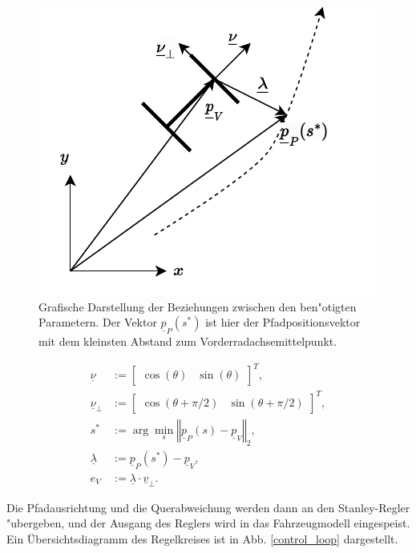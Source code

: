 \documentclass[arbeit=studie,oneside,BCOR=12mm]{ArbeitRST}
\begin{document}
\begin{figure}[h]
    \centering
    \includegraphics{dot_product}
    \caption{Grafische Darstellung der Beziehungen zwischen den ben"otigten
    Parametern. Der Vektor $\underline{p}_P(s^*)$ ist hier der Pfadpositionsvektor mit dem
    kleinsten Abstand zum Vorderradachsemittelpunkt.}
    \label{algorithm}
\end{figure}

\begin{subequations}
\begin{align}
    \underline{\nu} &:= \begin{bmatrix} \cos(\theta) & \sin(\theta) \end{bmatrix}^T, \\
        \underline{\nu}_{\perp} &:= \begin{bmatrix} \cos(\theta + \pi/2) & \sin(\theta + \pi/2) \end{bmatrix}^T, \\
            s^* &:= \arg\min_{s}  \left\Vert\underline{p}_P(s) - \underline{p}_V \right\Vert_2, \\
    \underline{\lambda} &:= \underline{p}_P(s^*) - \underline{p}_V, \\
    e_{V} &:= \underline{\lambda} \cdot \underline{v}_{\perp}.
 \label{alg:quer}
\end{align}
\end{subequations}

Die Pfadausrichtung und die Querabweichung werden dann an den Stanley-Regler "ubergeben,
und der Ausgang des Reglers wird in das Fahrzeugmodell eingespeist. Ein
Übersichtsdiagramm des Regelkreises ist in Abb. \ref{control_loop} dargestellt.
\end{document}
